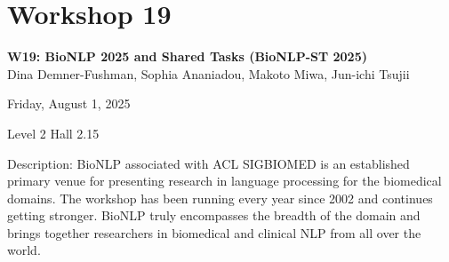 \clearpage


\section[W19: BioNLP 2025 and Shared Tasks (BioNLP-ST 2025)]{Workshop 19}
\label{workshop_19}

\begin{center}
    {\Large \textbf{W19: BioNLP 2025 and Shared Tasks (BioNLP-ST 2025)}}\\

 Dina Demner-Fushman, Sophia Ananiadou, Makoto Miwa, Jun-ichi Tsujii

    Friday, August 1, 2025
    
  Level 2 Hall 2.15
\end{center}

Description: BioNLP associated with ACL SIGBIOMED is an established primary venue for presenting research in language processing for the biomedical domains. The workshop has been running every year since 2002 and continues getting stronger. BioNLP truly encompasses the breadth of the domain and brings together researchers in biomedical and clinical NLP from all over the world.

